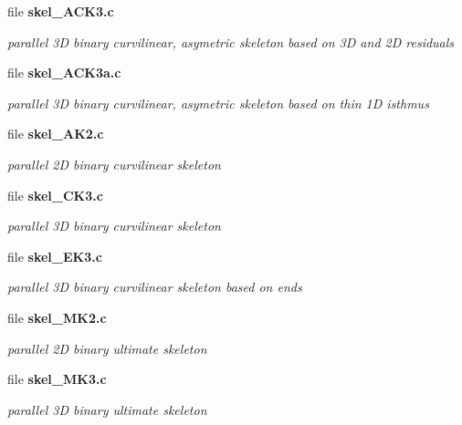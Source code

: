 \begin{CompactItemize}
\item 
file \bf{skel\_\-ACK3.c}
\begin{CompactList}\small\item\em parallel 3D binary curvilinear, asymetric skeleton based on 3D and 2D residuals \item\end{CompactList}

\item 
file \bf{skel\_\-ACK3a.c}
\begin{CompactList}\small\item\em parallel 3D binary curvilinear, asymetric skeleton based on thin 1D isthmus \item\end{CompactList}

\item 
file \bf{skel\_\-AK2.c}
\begin{CompactList}\small\item\em parallel 2D binary curvilinear skeleton \item\end{CompactList}

\item 
file \bf{skel\_\-CK3.c}
\begin{CompactList}\small\item\em parallel 3D binary curvilinear skeleton \item\end{CompactList}

\item 
file \bf{skel\_\-EK3.c}
\begin{CompactList}\small\item\em parallel 3D binary curvilinear skeleton based on ends \item\end{CompactList}

\item 
file \bf{skel\_\-MK2.c}
\begin{CompactList}\small\item\em parallel 2D binary ultimate skeleton \item\end{CompactList}

\item 
file \bf{skel\_\-MK3.c}
\begin{CompactList}\small\item\em parallel 3D binary ultimate skeleton \item\end{CompactList}


\end{CompactItemize}
